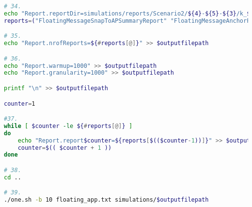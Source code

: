 \begin{lstlisting}[language=bash]
# 34.
echo "Report.reportDir=simulations/reports/Scenario2/${4}-${5}-${3}/k_${2}/"$(date "+%Y-%m-%d %H%M%S") >> $outputfilepath
reports=("FloatingMessageSnapToAPSummaryReport" "FloatingMessageAnchorPointsReport")

# 35.
echo "Report.nrofReports=${#reports[@]}" >> $outputfilepath

# 36.
echo "Report.warmup=1000" >> $outputfilepath
echo "Report.granularity=1000" >> $outputfilepath

printf "\n" >> $outputfilepath

counter=1

#37.
while [ $counter -le ${#reports[@]} ]
do
	echo "Report.report$counter=${reports[$(($counter-1))]}" >> $outputfilepath
	counter=$(( $counter + 1 ))
done

# 38.
cd ..

# 39.
./one.sh -b 10 floating_app.txt simulations/$outputfilepath

\end{lstlisting}
\vspace{5mm}
